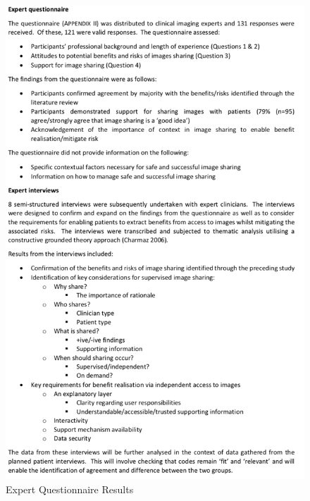 \begin{figure}[ht]
\centering
\includegraphics[width = 0.80\hsize]{./figures/ExpertResult}
\caption{Expert Questionnaire Results}
\end{figure}